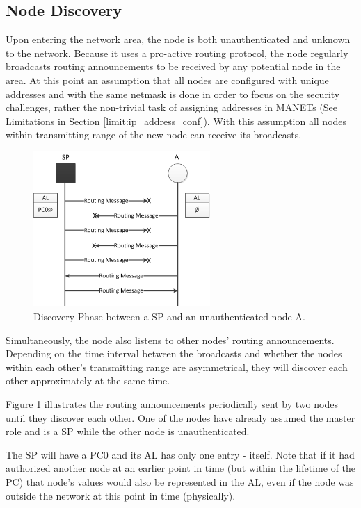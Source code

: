 \subsection{Node Discovery}
Upon entering the network area, the node is both unauthenticated and unknown to
the network. Because it uses a pro-active routing protocol, the node regularly
broadcasts routing announcements to be received by any potential node in the
area. At this point an assumption that all nodes are configured with unique
addresses and with the same netmask is done in order to focus on the security
challenges, rather the non-trivial task of assigning addresses in \acp{MANET}
(See Limitations in Section \ref{limit:ip_address_conf}). With this assumption all
nodes within transmitting range of the new node can receive its broadcasts.

\begin{figure}[h]
	\centering
  	\includegraphics[width=0.6\textwidth]{images/node_states_discovery.png}
  	\caption{Discovery Phase between a SP and an unauthenticated node A.}
	\label{fig:node_states_discovery}
\end{figure}

Simultaneously, the node also listens to other nodes' routing announcements.
Depending on the time interval between the broadcasts and whether the nodes
within each other's transmitting range are asymmetrical, they will discover each
other approximately at the same time.

Figure \ref{fig:node_states_discovery} illustrates the routing announcements
periodically sent by two nodes until they discover each other. One of the nodes
have already assumed the master role and is a \ac{SP} while the other node is
unauthenticated.

The \ac{SP} will have a \ac{PC0} and its \ac{AL} has only one entry - itself.
Note that if it had authorized another node at an earlier point in time (but
within the lifetime of the \ac{PC}) that node's values would also be
represented in the \ac{AL}, even if the node was outside the network at this
point in time (physically).

